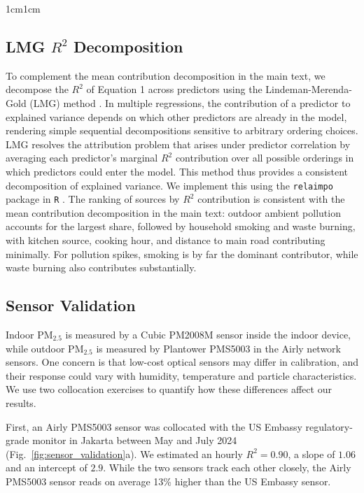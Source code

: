\documentclass[9pt,twoside]{pnas-new}
\begin{document}
\begin{adjustwidth}{1cm}{1cm}
\newpage

\subsection*{LMG $R^2$ Decomposition} 
To complement the mean contribution decomposition in the main text, we decompose the $R^2$ of Equation 1 across predictors using the Lindeman-Merenda-Gold (LMG) method \citep{lindeman_introduction_1980}. 
In multiple regressions, the contribution of a predictor to explained variance depends on which other predictors are already in the model, rendering simple sequential decompositions sensitive to arbitrary ordering choices. LMG resolves the attribution problem that arises under predictor correlation by averaging each predictor's marginal $R^2$ contribution over all possible orderings in which predictors could enter the model. This method thus provides a consistent decomposition of explained variance. We implement this using the \texttt{relaimpo} package in \texttt{R} \citep{gromping_relative_2006}. 
The ranking of sources by $R^2$ contribution is consistent with the mean contribution decomposition in the main text: outdoor ambient pollution accounts for the largest share, followed by household smoking and waste burning, with kitchen source, cooking hour, and distance to main road contributing minimally. For pollution spikes, smoking is by far the dominant contributor, while waste burning also contributes substantially.



\newpage 

\subsection*{Sensor Validation}

Indoor PM$_{2.5}$ is measured by a Cubic PM2008M sensor inside the indoor device, while outdoor PM$_{2.5}$ is measured by Plantower PMS5003 in the Airly network sensors. One concern is that low-cost optical sensors may differ in calibration, and their response could vary with humidity, temperature and particle characteristics. We use two collocation exercises to quantify how these differences affect our results.

First, an Airly PMS5003 sensor was collocated with the US Embassy regulatory-grade monitor in Jakarta between May and July 2024 (Fig.~\ref{fig:sensor_validation}a). We estimated an hourly $R^2 = 0.90$, a slope of $1.06$ and an intercept of $2.9$. While the two sensors track each other closely, the Airly PMS5003 sensor reads on average 13\% higher than the US Embassy sensor. 


\end{adjustwidth}
\end{document}
